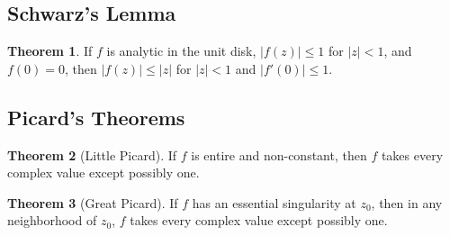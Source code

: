 \documentclass[11pt]{article}
\theoremstyle{definition}
\newtheorem{theorem}{Theorem}[section]
\begin{document}
\subsection{Schwarz's Lemma}
\begin{theorem}
If $f$ is analytic in the unit disk, $|f(z)| \leq 1$ for $|z| < 1$, and $f(0) = 0$, then $|f(z)| \leq |z|$ for $|z| < 1$ and $|f'(0)| \leq 1$.
\end{theorem}

\subsection{Picard's Theorems}
\begin{theorem}[Little Picard]
If $f$ is entire and non-constant, then $f$ takes every complex value except possibly one.
\end{theorem}

\begin{theorem}[Great Picard]
If $f$ has an essential singularity at $z_0$, then in any neighborhood of $z_0$, $f$ takes every complex value except possibly one.
\end{theorem}
\end{document}
